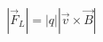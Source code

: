 \documentclass[preview]{standalone}
\begin{document}
\begin{align*}
|\vec{F}_L| = |q| |\vec{v} \times \vec{B}|
\end{align*}
\end{document}
